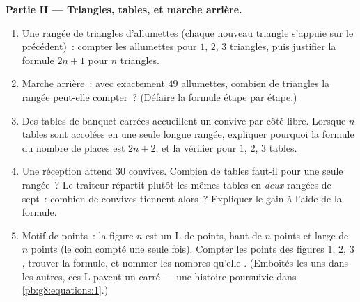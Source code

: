 \begin{problem}
\medskip
\noindent\textbf{Partie II --- Triangles, tables, et marche
arrière.}
\begin{enumerate}[resume]
  \item Une rangée de triangles d'allumettes (chaque nouveau
        triangle s'appuie sur le précédent)~: compter les allumettes
        pour $1$, $2$, $3$ triangles, puis justifier la formule
        $2n + 1$ pour $n$ triangles.
  \item Marche arrière~: avec exactement $49$ allumettes, combien de
        triangles la rangée peut-elle compter~? (Défaire la formule
        étape par étape.)
  \item Des tables de banquet carrées accueillent un convive par
        côté libre. Lorsque $n$ tables sont accolées en une seule
        longue rangée, expliquer pourquoi la formule du nombre de
        places est $2n + 2$, et la vérifier pour $1$, $2$, $3$
        tables.
  \item Une réception attend $30$ convives. Combien de tables faut-il
        pour une seule rangée~? Le traiteur répartit plutôt les mêmes
        tables en \emph{deux} rangées de sept~: combien de convives
        tiennent alors~? Expliquer le gain à l'aide de la formule.
  \item Motif de points~: la figure $n$ est un L de points, haut de
        $n$ points et large de $n$ points (le coin compté une seule
        fois). Compter les points des figures $1$, $2$, $3$, trouver
        la formule, et nommer les nombres qu'elle .
        (Emboîtés les uns dans les autres, ces L pavent un carré ---
        une histoire poursuivie dans \cref{pb:g8:equations:1}.)
\end{enumerate}


\end{problem}
